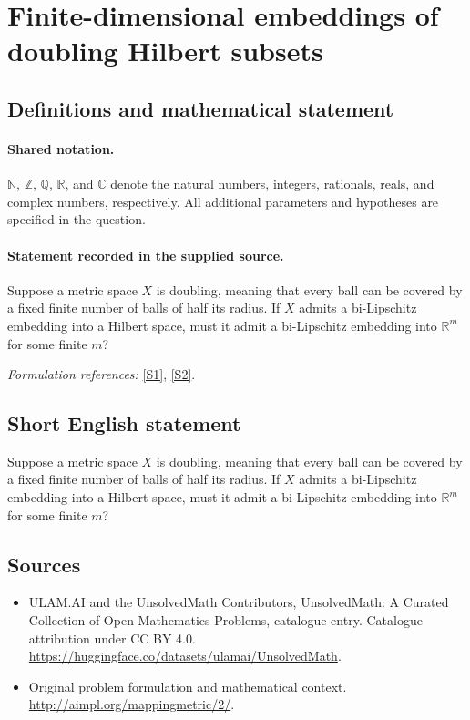 \documentclass[11pt]{article}
\newcommand{\sref}[2]{\hyperlink{source:#1:#2}{[S#2]}}
\begin{document}
\section{Finite-dimensional embeddings of doubling Hilbert subsets}\label{statement}

\subsection{Definitions and mathematical statement}

\paragraph{Shared notation.}$\mathbb N$, $\mathbb Z$, $\mathbb Q$, $\mathbb R$, and $\mathbb C$ denote the natural numbers, integers, rationals, reals, and complex numbers, respectively. All additional parameters and hypotheses are specified in the question.


\paragraph{Statement recorded in the supplied source.}
Suppose a metric space $X$ is doubling, meaning that every ball can be covered by a fixed finite number of balls of half its radius. If $X$ admits a bi-Lipschitz embedding into a Hilbert space, must it admit a bi-Lipschitz embedding into $\mathbb R^m$ for some finite $m$?
\par\smallskip\textit{Formulation references:} \sref{statement}{1}, \sref{statement}{2}.
\subsection{Short English statement}
Suppose a metric space $X$ is doubling, meaning that every ball can be covered by a fixed finite number of balls of half its radius. If $X$ admits a bi-Lipschitz embedding into a Hilbert space, must it admit a bi-Lipschitz embedding into $\mathbb R^m$ for some finite $m$?
\subsection{Sources}
\begin{itemize}
\item[\hypertarget{source:statement:1}{S1}] ULAM.AI and the UnsolvedMath Contributors, UnsolvedMath: A Curated Collection of Open Mathematics Problems, catalogue entry. Catalogue attribution under CC BY 4.0.
\url{https://huggingface.co/datasets/ulamai/UnsolvedMath}.
\item[\hypertarget{source:statement:2}{S2}] Original problem formulation and mathematical context.
\url{http://aimpl.org/mappingmetric/2/}.
\end{itemize}
\label{end:statement}
\end{document}
